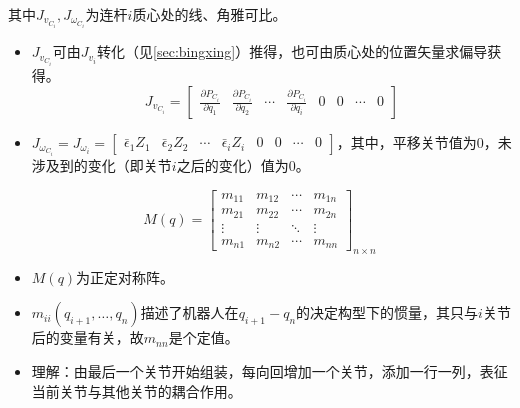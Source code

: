 \documentclass[
12pt, %
a4paper, 
oneside, %
headinclude,footinclude, %
]{scrartcl}
\begin{document}
其中$ J_{v_{C_i}}, J_{\omega_{C_i}} $为连杆$ i $质心处的线、角雅可比。
\begin{itemize}
\item $ J_{v_{C_i}} $可由$ J_{v_i} $转化（见\ref{sec:bingxing}）推得，也可由质心处的位置矢量求偏导获得。
$$ J_{v_{C_i}} = \begin{bmatrix} \frac{\partial P_{C_i}}{\partial q_1} & \frac{\partial P_{C_i}}{\partial q_2} & \cdots & \frac{\partial P_{C_i}}{\partial q_i} & 0 & 0 & \cdots & 0 \end{bmatrix} $$
\item $ J_{\omega_{C_i}} = J_{\omega_i} = \begin{bmatrix} \bar{\epsilon}_1 Z_1 & \bar{\epsilon}_2 Z_2 & \cdots & \bar{\epsilon}_i Z_i & 0 & 0 & \cdots & 0 \end{bmatrix} $，其中，平移关节值为$ 0 $，未涉及到的变化（即关节$ i $之后的变化）值为$ 0 $。
\end{itemize}
$$ M(q) = \begin{bmatrix} m_{11} & m_{12} & \cdots & m_{1n} \\ m_{21} & m_{22} & \cdots & m_{2n} \\ \vdots & \vdots & \ddots & \vdots \\ m_{n1} & m_{n2} & \cdots & m_{nn} \end{bmatrix}_{n \times n} $$
\begin{itemize}
\item $ M(q) $为正定对称阵。
\item $ m_{ii}(q_{i + 1}, \dots, q_n) $描述了机器人在$ q_{i + 1} - q_n $的决定构型下的惯量，其只与$ i $关节后的变量有关，故$ m_{nn} $是个定值。
\item 理解：由最后一个关节开始组装，每向回增加一个关节，添加一行一列，表征当前关节与其他关节的耦合作用。
\end{itemize}
\end{document}
